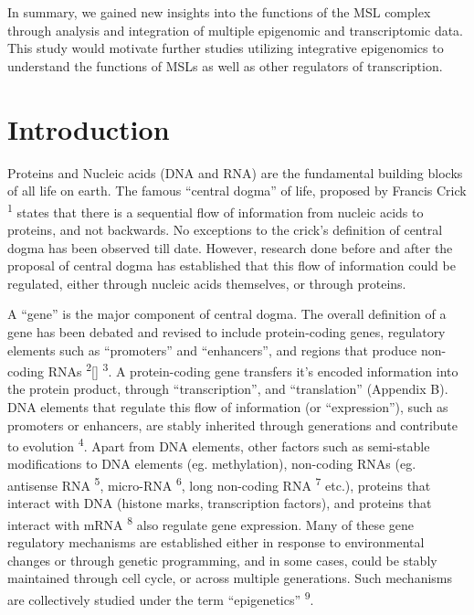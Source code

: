 \documentclass[11pt,twoside]{MPIthesis}
\theoremstyle{definition}
\theoremstyle{definition}
\theoremstyle{definition}
\theoremstyle{remark}
\begin{document}
In summary, we gained new insights into the functions of the MSL complex
through analysis and integration of multiple epigenomic and
transcriptomic data. This study would motivate further studies utilizing
integrative epigenomics to understand the functions of MSLs as well as
other regulators of transcription. 

\chapter{Introduction}\label{introduction}

Proteins and Nucleic acids (DNA and RNA) are the fundamental building
blocks of all life on earth. The famous ``central dogma'' of life,
proposed by Francis Crick \textsuperscript{1} states that there is a
sequential flow of information from nucleic acids to proteins, and not
backwards. No exceptions to the crick's definition of central dogma has
been observed till date. However, research done before and after the
proposal of central dogma has established that this flow of information
could be regulated, either through nucleic acids themselves, or through
proteins.

A ``gene'' is the major component of central dogma. The overall
definition of a gene has been debated and revised to include
protein-coding genes, regulatory elements such as ``promoters'' and
``enhancers'', and regions that produce non-coding RNAs
\textsuperscript{2}{[}{]} \textsuperscript{3}. A protein-coding gene
transfers it's encoded information into the protein product, through
``transcription'', and ``translation'' (Appendix B). DNA elements that
regulate this flow of information (or ``expression''), such as promoters
or enhancers, are stably inherited through generations and contribute to
evolution \textsuperscript{4}. Apart from DNA elements, other factors
such as semi-stable modifications to DNA elements (eg. methylation),
non-coding RNAs (eg. antisense RNA \textsuperscript{5}, micro-RNA
\textsuperscript{6}, long non-coding RNA \textsuperscript{7} etc.),
proteins that interact with DNA (histone marks, transcription factors),
and proteins that interact with mRNA \textsuperscript{8} also regulate
gene expression. Many of these gene regulatory mechanisms are
established either in response to environmental changes or through
genetic programming, and in some cases, could be stably maintained
through cell cycle, or across multiple generations. Such mechanisms are
collectively studied under the term ``epigenetics'' \textsuperscript{9}.
\end{document}
